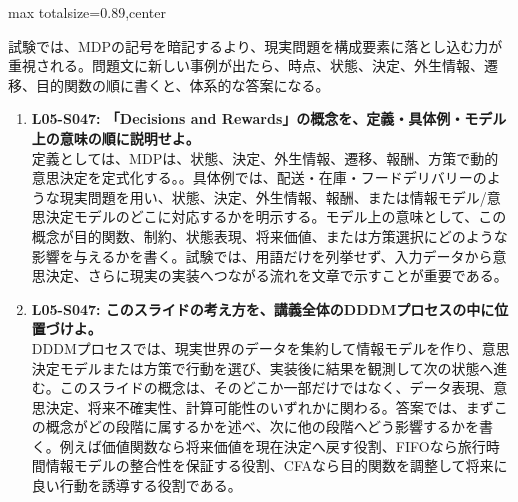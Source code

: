 \begin{minipage}[t]{0.58\textwidth}
\begin{adjustbox}{max totalsize={\textwidth}{0.89\textheight},center}
\begin{minipage}{\textwidth}
試験では、MDPの記号を暗記するより、現実問題を構成要素に落とし込む力が重視される。問題文に新しい事例が出たら、時点、状態、決定、外生情報、遷移、目的関数の順に書くと、体系的な答案になる。\par{}\begin{enumerate}\item \textbf{L05-S047: 「Decisions and Rewards」の概念を、定義・具体例・モデル上の意味の順に説明せよ。}\\定義としては、MDPは、状態、決定、外生情報、遷移、報酬、方策で動的意思決定を定式化する。。具体例では、配送・在庫・フードデリバリーのような現実問題を用い、状態、決定、外生情報、報酬、または情報モデル/意思決定モデルのどこに対応するかを明示する。モデル上の意味として、この概念が目的関数、制約、状態表現、将来価値、または方策選択にどのような影響を与えるかを書く。試験では、用語だけを列挙せず、入力データから意思決定、さらに現実の実装へつながる流れを文章で示すことが重要である。\item \textbf{L05-S047: このスライドの考え方を、講義全体のDDDMプロセスの中に位置づけよ。}\\DDDMプロセスでは、現実世界のデータを集約して情報モデルを作り、意思決定モデルまたは方策で行動を選び、実装後に結果を観測して次の状態へ進む。このスライドの概念は、そのどこか一部だけではなく、データ表現、意思決定、将来不確実性、計算可能性のいずれかに関わる。答案では、まずこの概念がどの段階に属するかを述べ、次に他の段階へどう影響するかを書く。例えば価値関数なら将来価値を現在決定へ戻す役割、FIFOなら旅行時間情報モデルの整合性を保証する役割、CFAなら目的関数を調整して将来に良い行動を誘導する役割である。\end{enumerate}
\end{minipage}
\end{adjustbox}
\end{minipage}


